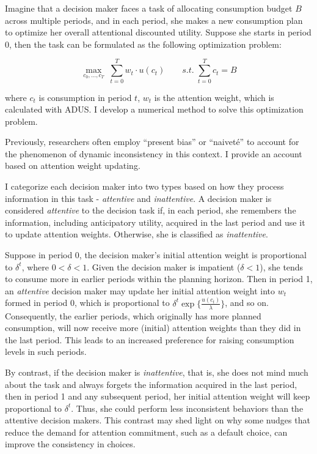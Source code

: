 \documentclass[
  12pt,
]{article}
\begin{document}
Imagine that a decision maker faces a task of allocating consumption
budget \(B\) across multiple periods, and in each period, she makes a
new consumption plan to optimize her overall attentional discounted
utility. Suppose she starts in period 0, then the task can be formulated
as the following optimization problem:

\[
\max_{c_0,...,c_T}\;\sum_{t=0}^T w_t\cdot u(c_t) \qquad s.t.\;\sum_{t=0}^T c_t=B  
\]

where \(c_t\) is consumption in period \(t\), \(w_t\) is the attention
weight, which is calculated with ADUS. I develop a numerical method to
solve this optimization problem.

Previously, researchers often employ ``present bias''
\citep{laibson_golden_1997} or ``naiveté'' \citep{odonoghue_doing_1999}
to account for the phenomenon of dynamic inconsistency in this context.
I provide an account based on attention weight updating.

I categorize each decision maker into two types based on how they
process information in this task - \emph{attentive} and
\emph{inattentive}. A decision maker is considered \emph{attentive} to
the decision task if, in each period, she remembers the information,
including anticipatory utility, acquired in the last period and use it
to update attention weights. Otherwise, she is classified as
\emph{inattentive}.

Suppose in period 0, the decision maker's initial attention weight is
proportional to \(\delta^t\), where \(0<\delta<1\). Given the decision
maker is impatient (\(\delta<1\)), she tends to consume more in earlier
periods within the planning horizon. Then in period 1, an
\emph{attentive} decision maker may update her initial attention weight
into \(w_t\) formed in period 0, which is proportional to
\(\delta^t\exp\{\frac{u(c_t)}{\lambda}\}\), and so on. Consequently, the
earlier periods, which originally has more planned consumption, will now
receive more (initial) attention weights than they did in the last
period. This leads to an increased preference for raising consumption
levels in such periods.

By contrast, if the decision maker is \emph{inattentive}, that is, she
does not mind much about the task and always forgets the information
acquired in the last period, then in period 1 and any subsequent period,
her initial attention weight will keep proportional to \(\delta^t\).
Thus, she could perform less inconsistent behaviors than the attentive
decision makers. This contrast may shed light on why some nudges that
reduce the demand for attention commitment, such as a default choice,
can improve the consistency in choices.
\end{document}
